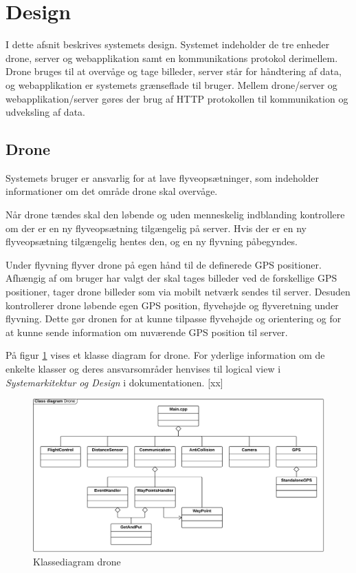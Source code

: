 \section{Design}

I dette afsnit beskrives systemets design. Systemet indeholder de tre enheder drone, server og webapplikation samt en kommunikations protokol derimellem. Drone bruges til at overvåge og tage billeder, server står for håndtering af data, og webapplikation er systemets grænseflade til bruger. Mellem drone/server og webapplikation/server gøres der brug af HTTP protokollen til kommunikation og udveksling af data.



\subsection{Drone}

Systemets bruger er ansvarlig for at lave flyveopsætninger, som indeholder informationer om det område drone skal overvåge.

Når drone tændes skal den løbende og uden menneskelig indblanding kontrollere om der er en ny flyveopsætning tilgængelig på server. Hvis der er en ny flyveopsætning tilgængelig hentes den, og en ny flyvning påbegyndes. 

Under flyvning flyver drone på egen hånd til de definerede GPS positioner. Afhængig af om bruger har valgt der skal tages billeder ved de forskellige GPS positioner, tager drone billeder som via mobilt netværk sendes til server. 
Desuden kontrollerer drone løbende egen GPS position, flyvehøjde og flyveretning under flyvning. Dette gør dronen for at kunne tilpasse flyvehøjde og orientering og for at kunne sende information om nuværende GPS position til server.

På figur \ref{fig:class_drone} vises et klasse diagram for drone. For yderlige information om de enkelte klasser og deres ansvarsområder henvises til logical view i \textit{Systemarkitektur og Design} i dokumentationen. [xx]


\begin{figure}[H]
\centering
\includegraphics[width=1\textwidth]{Billeder/Design_Class_drone.png}
\vspace{-0.5cm}
\caption{Klassediagram drone}
\label{fig:class_drone}
\end{figure}


